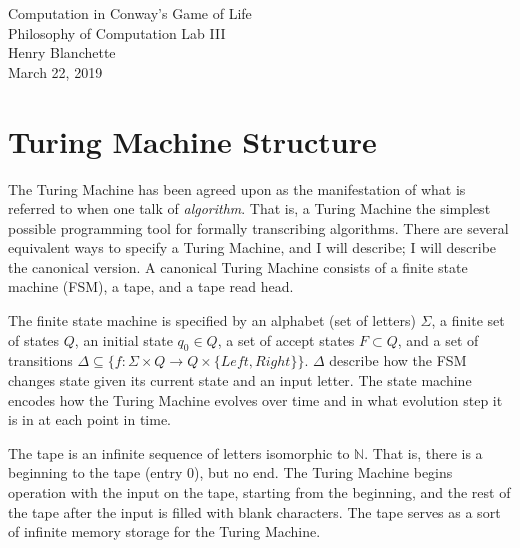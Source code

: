 \documentclass{article}
\begin{document}
\begin{center}{\huge   Computation in Conway's Game of Life }\\[0.4cm]{\large  Philosophy of Computation Lab III }\\[0.75cm]{\large  Henry Blanchette }\\[0.5cm]{\large  March 22, 2019 }\\[1.0cm]\begin{abstract}
    There are many explorations into the constructing of computing devices in Conway's Game of Life online in niche articles, but most of them are not approachable and do not detail well their methods in visuals or prose. In this lab I attempt to provide an addition to this corpus by explaining Paul Rendell's Turing Machine modular construction method in a fully bottom-up manner with visuals and formal explanations side-by-side.
\end{abstract}\end{center} \section{Turing Machine Structure}


The Turing Machine has been agreed upon as the manifestation of what is referred to when one talk of \textit{algorithm}. That is, a Turing Machine the simplest possible programming tool for formally transcribing algorithms. There are several equivalent ways to specify a Turing Machine, and I will describe; I will describe the canonical version. A canonical Turing Machine consists of a finite state machine (FSM), a tape, and a tape read head.





The finite state machine is specified by an alphabet (set of letters) $  \Sigma  $, a finite set of states $  Q  $, an initial state $  q_0 \in Q  $, a set of accept states $  F \subset Q  $, and a set of transitions $  \Delta \subseteq \{ f : \Sigma \times Q \rightarrow Q \times \{Left, Right\} \}  $. $  \Delta  $ describe how the FSM changes state given its current state and an input letter. The state machine encodes how the Turing Machine evolves over time and in what evolution step it is in at each point in time.





The tape is an infinite sequence of letters isomorphic to $  \mathbb{N}  $. That is, there is a beginning to the tape (entry 0), but no end. The Turing Machine begins operation with the input on the tape, starting from the beginning, and the rest of the tape after the input is filled with blank characters. The tape serves as a sort of infinite memory storage for the Turing Machine.
\end{document}
